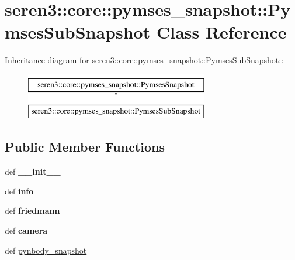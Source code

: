 \hypertarget{classseren3_1_1core_1_1pymses__snapshot_1_1PymsesSubSnapshot}{
\section{seren3::core::pymses\_\-snapshot::PymsesSubSnapshot Class Reference}
\label{classseren3_1_1core_1_1pymses__snapshot_1_1PymsesSubSnapshot}
}
Inheritance diagram for seren3::core::pymses\_\-snapshot::PymsesSubSnapshot::\begin{figure}[H]
\begin{center}
\leavevmode
\includegraphics[height=2cm]{classseren3_1_1core_1_1pymses__snapshot_1_1PymsesSubSnapshot}
\end{center}
\end{figure}
\subsection*{Public Member Functions}
\begin{DoxyCompactItemize}
\item 
\hypertarget{classseren3_1_1core_1_1pymses__snapshot_1_1PymsesSubSnapshot_a8fc647e229d3c909f3246f8e93e86126}{
def {\bfseries \_\-\_\-init\_\-\_\-}}
\label{classseren3_1_1core_1_1pymses__snapshot_1_1PymsesSubSnapshot_a8fc647e229d3c909f3246f8e93e86126}

\item 
\hypertarget{classseren3_1_1core_1_1pymses__snapshot_1_1PymsesSubSnapshot_a9cb850dba4f1ca91fce98d7cd04e2da2}{
def {\bfseries info}}
\label{classseren3_1_1core_1_1pymses__snapshot_1_1PymsesSubSnapshot_a9cb850dba4f1ca91fce98d7cd04e2da2}

\item 
\hypertarget{classseren3_1_1core_1_1pymses__snapshot_1_1PymsesSubSnapshot_ae4a530daf6f2d5a6321304743eda81d3}{
def {\bfseries friedmann}}
\label{classseren3_1_1core_1_1pymses__snapshot_1_1PymsesSubSnapshot_ae4a530daf6f2d5a6321304743eda81d3}

\item 
\hypertarget{classseren3_1_1core_1_1pymses__snapshot_1_1PymsesSubSnapshot_a8852bfb1918e768566127bbdb74e70c5}{
def {\bfseries camera}}
\label{classseren3_1_1core_1_1pymses__snapshot_1_1PymsesSubSnapshot_a8852bfb1918e768566127bbdb74e70c5}

\item 
def \hyperlink{classseren3_1_1core_1_1pymses__snapshot_1_1PymsesSubSnapshot_a720e2e8030b60617ec083944bc8653ac}{pynbody\_\-snapshot}
\end{DoxyCompactItemize}
